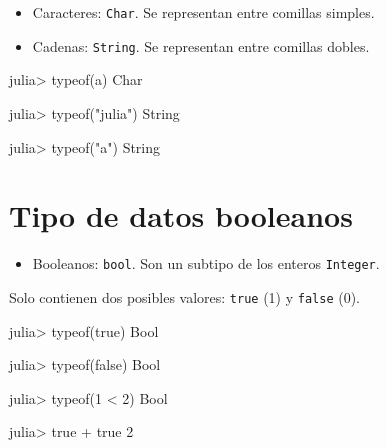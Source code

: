 \documentclass[
  letterpaper,
  DIV=11,
  numbers=noendperiod]{scrreprt}
\newenvironment{Shaded}{\begin{snugshade}}{\end{snugshade}}
\newcommand{\CharTok}[1]{\textcolor[rgb]{0.13,0.47,0.30}{#1}}
\newcommand{\ConstantTok}[1]{\textcolor[rgb]{0.56,0.35,0.01}{#1}}
\newcommand{\DataTypeTok}[1]{\textcolor[rgb]{0.68,0.00,0.00}{#1}}
\newcommand{\FloatTok}[1]{\textcolor[rgb]{0.68,0.00,0.00}{#1}}
\newcommand{\FunctionTok}[1]{\textcolor[rgb]{0.28,0.35,0.67}{#1}}
\newcommand{\NormalTok}[1]{\textcolor[rgb]{0.00,0.23,0.31}{#1}}
\newcommand{\OperatorTok}[1]{\textcolor[rgb]{0.37,0.37,0.37}{#1}}
\newcommand{\StringTok}[1]{\textcolor[rgb]{0.13,0.47,0.30}{#1}}
\providecommand{\tightlist}{%
  \setlength{\itemsep}{0pt}\setlength{\parskip}{0pt}}\usepackage{longtable,booktabs,array}
\begin{document}
\begin{itemize}
\tightlist
\item
  Caracteres: \texttt{Char}. Se representan entre comillas simples.
\item
  Cadenas: \texttt{String}. Se representan entre comillas dobles.
\end{itemize}

\begin{Shaded}
\begin{Highlighting}[]
\NormalTok{julia}\OperatorTok{\textgreater{}} \FunctionTok{typeof}\NormalTok{(}\CharTok{\textquotesingle{}a\textquotesingle{}}\NormalTok{)}
\DataTypeTok{Char}

\NormalTok{julia}\OperatorTok{\textgreater{}} \FunctionTok{typeof}\NormalTok{(}\StringTok{"julia"}\NormalTok{)}
\DataTypeTok{String}

\NormalTok{julia}\OperatorTok{\textgreater{}} \FunctionTok{typeof}\NormalTok{(}\StringTok{"a"}\NormalTok{)}
\DataTypeTok{String}
\end{Highlighting}
\end{Shaded}

\hypertarget{tipo-de-datos-booleanos}{%
\section{Tipo de datos booleanos}\label{tipo-de-datos-booleanos}}

\begin{itemize}
\tightlist
\item
  Booleanos: \texttt{bool}. Son un subtipo de los enteros
  \texttt{Integer}.
\end{itemize}

Solo contienen dos posibles valores: \texttt{true} (1) y \texttt{false}
(0).

\begin{Shaded}
\begin{Highlighting}[]
\NormalTok{julia}\OperatorTok{\textgreater{}} \FunctionTok{typeof}\NormalTok{(}\ConstantTok{true}\NormalTok{)}
\DataTypeTok{Bool}

\NormalTok{julia}\OperatorTok{\textgreater{}} \FunctionTok{typeof}\NormalTok{(}\ConstantTok{false}\NormalTok{)}
\DataTypeTok{Bool}

\NormalTok{julia}\OperatorTok{\textgreater{}} \FunctionTok{typeof}\NormalTok{(}\FloatTok{1} \OperatorTok{\textless{}} \FloatTok{2}\NormalTok{)}
\DataTypeTok{Bool}

\NormalTok{julia}\OperatorTok{\textgreater{}} \ConstantTok{true} \OperatorTok{+} \ConstantTok{true}
\FloatTok{2}
\end{Highlighting}
\end{Shaded}
\end{document}

